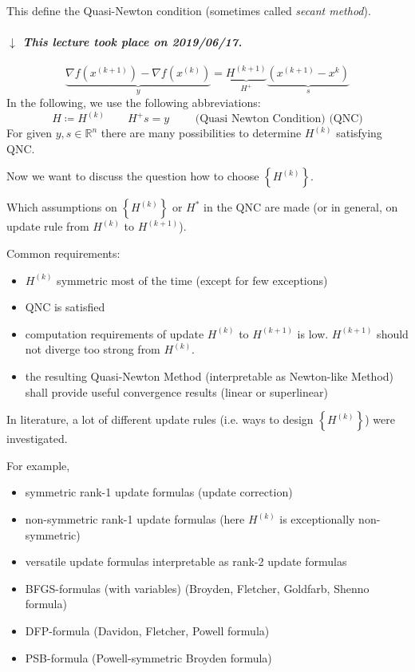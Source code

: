 \documentclass[a4paper]{article}
\numberwithin{lecref}{subsection}
\newcommand{\Set}[1]{\left\{#1\right\}}
\newcommand{\dateref}[1]{%
  \begin{mdframed}[backgroundcolor=gray!10,innerbottommargin=0pt,innertopmargin=0pt]
    \paragraph{\textit{$\downarrow$ This lecture took place on #1.}}%
  \end{mdframed}%
}
\begin{document}
This define the Quasi-Newton condition (sometimes called \emph{secant method}).

\dateref{2019/06/17}

\[ \underbrace{\nabla f(x^{(k+1)}) - \nabla f(x^{(k)})}_{y} = \underbrace{H^{(k+1)}}_{H^+} \underbrace{\left(x^{(k+1)} - x^k\right)}_s \]
In the following, we use the following abbreviations:
\[ H \coloneqq H^{(k)} \qquad H^+ s = y \qquad \text{ (Quasi Newton Condition) (QNC)} \]
For given $y, s \in \mathbb R^n$ there are many possibilities to determine $H^{(k)}$ satisfying QNC.

Now we want to discuss the question how to choose $\Set{H^{(k)}}$.

Which assumptions on $\Set{H^{(k)}}$ or $H^*$ in the QNC are made (or in general, on update rule from $H^{(k)}$ to $H^{(k+1)}$).

Common requirements:
\begin{itemize}
	\item $H^{(k)}$ symmetric most of the time (except for few exceptions)
	\item QNC is satisfied
	\item computation requirements of update $H^{(k)}$ to $H^{(k+1)}$ is low. $H^{(k+1)}$ should not diverge too strong from $H^{(k)}$.
	\item the resulting Quasi-Newton Method (interpretable as Newton-like Method) shall provide useful convergence results (linear or superlinear)
\end{itemize}

In literature, a lot of different update rules (i.e. ways to design $\Set{H^{(k)}}$) were investigated.

For example,
\begin{itemize}
	\item symmetric rank-1 update formulas (update correction)
	\item non-symmetric rank-1 update formulas (here $H^{(k)}$ is exceptionally non-symmetric)
	\item versatile update formulas interpretable as rank-2 update formulas
	\item BFGS-formulas (with variables) (Broyden, Fletcher, Goldfarb, Shenno formula)
	\item DFP-formula (Davidon, Fletcher, Powell formula)
	\item PSB-formula (Powell-symmetric Broyden formula)
\end{itemize}
\end{document}
